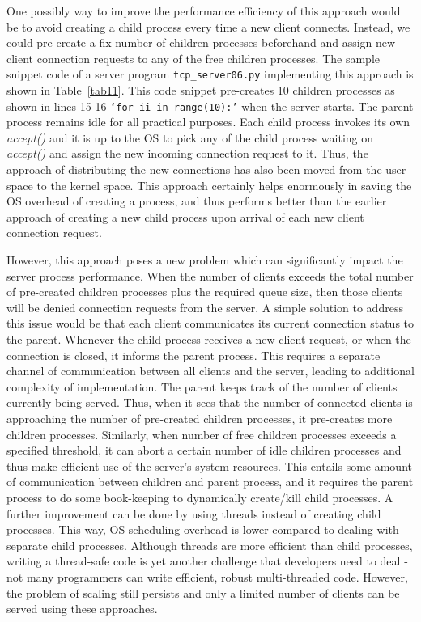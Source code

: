 \begin{multicols}{2}

One possibly way to improve the performance efficiency of this approach would be to avoid creating a child process every time a new client connects. Instead, we could pre-create a fix number of children processes beforehand and assign new client connection requests to any of the free children processes. The sample snippet code of a server program \texttt{tcp\_server06.py} \cite{art1-key17} implementing this approach is shown in Table~\ref{tab11}.  This code snippet pre-creates 10 children processes as shown in lines 15-16  \texttt{‘for ii in range(10):’} when the server starts. The parent process remains idle for all practical purposes. Each child process invokes its own \textit{accept()} and it is up to the OS to pick any of the child process waiting on \textit{accept()} and assign the new incoming connection request to it. Thus, the approach of distributing the new connections has also been moved from the user space to the kernel space. This approach certainly helps enormously in saving the OS overhead of creating a process, and thus performs better than the earlier approach of creating a new child process upon arrival of each new client connection request.

However, this approach poses a new problem which can significantly impact the server process performance. When the number of clients exceeds the total number of pre-created children processes plus the required queue size, then those clients will be denied connection requests from the server. A simple solution to address this issue would be that each client communicates its current connection status to the parent. Whenever the child process receives a new client request, or when the connection is closed, it informs the parent process. This requires a separate channel of communication between all clients and the server, leading to additional complexity of implementation. The parent keeps track of the number of clients currently being served. Thus, when it sees that the number of connected clients is approaching the number of pre-created children processes, it pre-creates more children processes. Similarly, when number of free children processes exceeds a specified threshold, it can abort a certain number of idle children processes and thus make efficient use of the server’s system resources. This entails some amount of communication between children and parent process, and it requires the parent process to do some book-keeping to dynamically create/kill child processes. A further improvement can be done by using threads instead of creating child processes. This way, OS scheduling overhead is lower compared to dealing with separate child processes. Although threads are more efficient than child processes, writing a thread-safe code is yet another challenge that developers need to deal - not many programmers can write efficient, robust multi-threaded code. However, the problem of scaling still persists and only a limited number of clients can be served using these approaches. 
\end{multicols}

